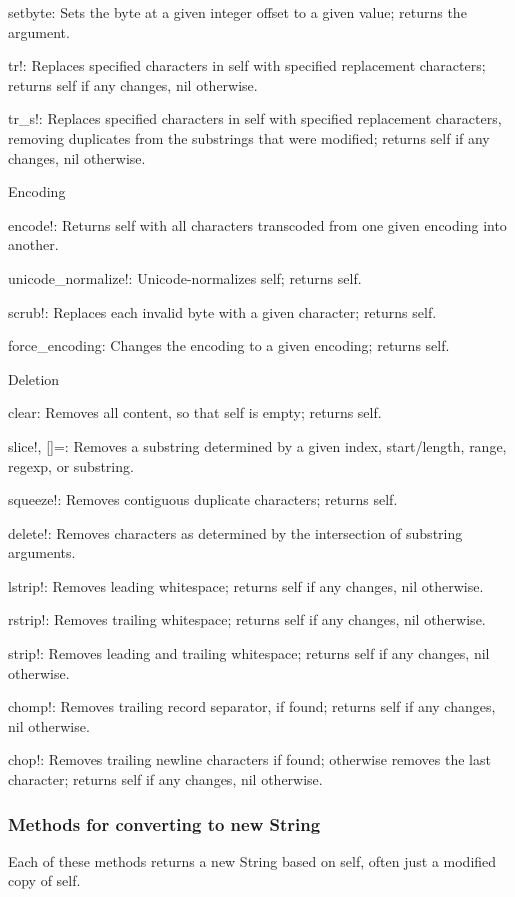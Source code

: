setbyte: Sets the byte at a given integer offset to a given value; returns the argument.

tr!: Replaces specified characters in self with specified replacement characters; returns self if any changes, nil otherwise.

tr\_s!: Replaces specified characters in self with specified replacement characters, removing duplicates from the substrings that were modified; returns self if any changes, nil otherwise.


Encoding

encode!: Returns self with all characters transcoded from one given encoding into another.

unicode\_normalize!: Unicode-normalizes self; returns self.

scrub!: Replaces each invalid byte with a given character; returns self.

force\_encoding: Changes the encoding to a given encoding; returns self.

Deletion

clear: Removes all content, so that self is empty; returns self.

slice!, []=: Removes a substring determined by a given index, start/length, range, regexp, or substring.

squeeze!: Removes contiguous duplicate characters; returns self.

delete!: Removes characters as determined by the intersection of substring arguments.

lstrip!: Removes leading whitespace; returns self if any changes, nil otherwise.

rstrip!: Removes trailing whitespace; returns self if any changes, nil otherwise.

strip!: Removes leading and trailing whitespace; returns self if any changes, nil otherwise.

chomp!: Removes trailing record separator, if found; returns self if any changes, nil otherwise.

chop!: Removes trailing newline characters if found; otherwise removes the last character; returns self if any changes, nil otherwise.



\subsubsection{Methods for converting to new String}
Each of these methods returns a new String based on self, often just a modified copy of self.

